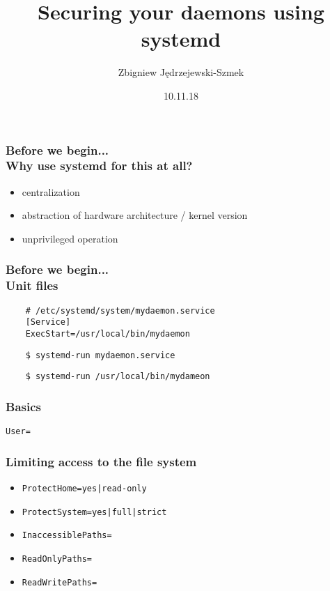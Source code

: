 \documentclass[serif]{beamer}
\title[Systemd security features]{Securing your daemons using systemd}
\author{Zbigniew Jędrzejewski-Szmek}
\institute{%
  \texttt{[image: beamer-themeredhat/redhat.png]}\\
  \medskip
  \textit{zbyszek@in.waw.pl}
}
\date{\tiny 10.11.18}
\begin{document}
\begin{frame}
\titlepage %
\end{frame}

\begin{frame}
  \frametitle{Before we begin...\\Why use systemd for this at all?}
  \begin{itemize}
  \item centralization
  \item abstraction of hardware architecture / kernel version
  \item unprivileged operation
  \end{itemize}
\end{frame}

\begin{frame}[fragile]
  \frametitle{Before we begin...\\Unit files}

  \begin{verbatim}
    # /etc/systemd/system/mydaemon.service
    [Service]
    ExecStart=/usr/local/bin/mydaemon
  \end{verbatim}
  \begin{verbatim}
    $ systemd-run mydaemon.service
  \end{verbatim}

  \medskip

  \begin{verbatim}
    $ systemd-run /usr/local/bin/mydameon
  \end{verbatim}
\end{frame}



\begin{frame}
  \frametitle{Basics}
  \texttt{User=}
\end{frame}

\begin{frame}
  \frametitle{Limiting access to the file system}
  \begin{itemize}
  \item \texttt{ProtectHome=yes|read-only}
  \item \texttt{ProtectSystem=yes|full|strict}

  \item \texttt{InaccessiblePaths=}
  \item \texttt{ReadOnlyPaths=}
  \item \texttt{ReadWritePaths=}
  \end{itemize}
\end{frame}
\end{document}
